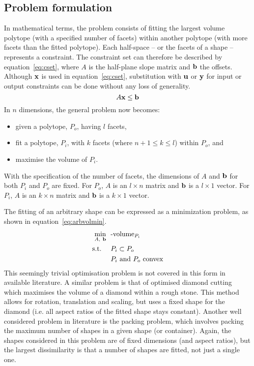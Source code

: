 \subsection{Problem formulation}
In mathematical terms, the problem consists of fitting the largest volume polytope (with a specified number of facets) within another polytope (with more facets than the fitted polytope).
Each half-space -- or the facets of a shape -- represents a constraint.
The constraint set can therefore be described by equation~\ref{eq:cset}, where $A$ is the half-plane slope matrix and ${\bf {b}}$ the offsets.
Although ${\bf {x}}$ is used in equation~\ref{eq:cset}, substitution with ${\bf {u}}$ or ${\bf {y}}$ for input or output constraints can be done without any loss of generality.
\begin{equation}
  \label{eq:cset}
  A{\bf {x}} \leq {\bf {b}}
\end{equation}
In $n$ dimensions, the general problem now becomes: 
\begin{itemize}
  \item given a polytope, $P_o$, having $l$ facets,
  \item fit a polytope, $P_i$, with $k$ facets (where $n+1 \leq k \le l$) within $P_o$, and
  \item maximise the volume of $P_i$.
\end{itemize} 
With the specification of the number of facets, the dimensions of $A$ and ${\bf {b}}$ for both $P_i$ and $P_o$ are fixed.
For $P_o$, $A$ is an $l \times n$ matrix and ${\bf {b}}$ is a $l \times 1$ vector.
For $P_i$, $A$ is an $k \times n$ matrix and ${\bf {b}}$ is a $k \times 1$ vector.

The fitting of an arbitrary shape can be expressed as a minimization problem, as shown in equation~\ref{eq:arbvolmin}.
\begin{align}
  \label{eq:arbvolmin}
    \min_{A,~{\bf {b}}}~~&\text{-volume}_{P_i}\\
    \text{s.t.}~~~~ &P_i \subset P_o \notag \\
                    &P_i \text{~and~} P_o \text{~convex} \notag
\end{align}
This seemingly trivial optimisation problem is not covered in this form in available literature.
A similar problem is that of optimised diamond cutting \citep{diamondcut} which maximises the volume of a diamond within a rough stone.
This method allows for rotation, translation and scaling, but uses a fixed shape for the diamond (i.e. all aspect ratios of the fitted shape stays constant).
Another well considered problem in literature is the packing problem, which involves packing the maximum number of shapes in a given shape (or container).
Again, the shapes considered in this problem are of fixed dimensions (and aspect ratios), but the largest dissimilarity is that a number of shapes are fitted, not just a single one.

